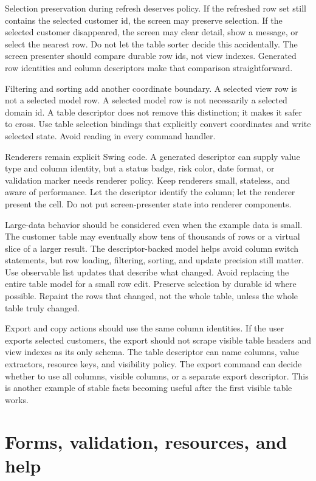Selection preservation during refresh deserves policy. If the refreshed row
set still contains the selected customer id, the screen may preserve
selection. If the selected customer disappeared, the screen may clear detail,
show a message, or select the nearest row. Do not let the table sorter decide
this accidentally. The screen presenter should compare durable row ids, not view
indexes. Generated row identities and column descriptors make that comparison
straightforward.

Filtering and sorting add another coordinate boundary. A selected view row is
not a selected model row. A selected model row is not necessarily a selected
domain id. A table descriptor does not remove this distinction; it makes it
safer to cross. Use table selection bindings that explicitly convert
coordinates and write selected state. Avoid reading  in
every command handler.

Renderers remain explicit Swing code. A generated descriptor can supply value
type and column identity, but a status badge, risk color, date format, or
validation marker needs renderer policy. Keep renderers small, stateless, and
aware of performance. Let the descriptor identify the column; let the renderer
present the cell. Do not put screen-presenter state into renderer components.

Large-data behavior should be considered even when the example data is small.
The customer table may eventually show tens of thousands of rows or a virtual
slice of a larger result. The descriptor-backed model helps avoid column
switch statements, but row loading, filtering, sorting, and update precision
still matter. Use observable list updates that describe what changed. Avoid
replacing the entire table model for a small row edit. Preserve selection by
durable id where possible. Repaint the rows that changed, not the whole table,
unless the whole table truly changed.

Export and copy actions should use the same column identities. If the user
exports selected customers, the export should not scrape visible table headers
and view indexes as its only schema. The table descriptor can name columns,
value extractors, resource keys, and visibility policy. The export command can
decide whether to use all columns, visible columns, or a separate export
descriptor. This is another example of stable facts becoming useful after the
first visible table works.

\section{Forms, validation, resources, and help}

